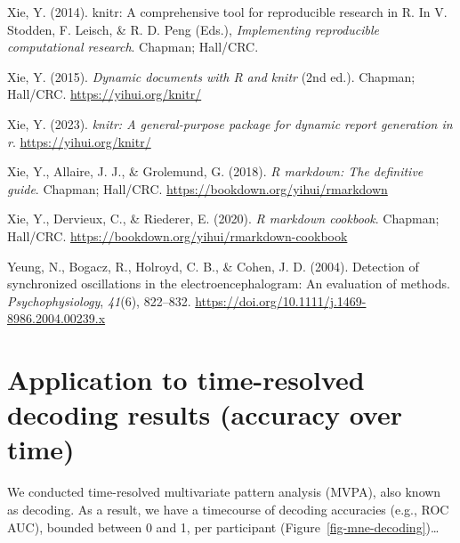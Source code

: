 \documentclass[
  doc,
  floatsintext,
  longtable,
  a4paper,
  nolmodern,
  notxfonts,
  notimes,
  colorlinks=true,linkcolor=blue,citecolor=blue,urlcolor=blue]{apa7}
\newlength{\cslhangindent}
\newenvironment{CSLReferences}[2] %
 {\begin{list}{}{%
  \setlength{\itemindent}{0pt}
  \setlength{\leftmargin}{0pt}
  \setlength{\parsep}{0pt}
  \ifodd #1
   \setlength{\leftmargin}{\cslhangindent}
   \setlength{\itemindent}{-1\cslhangindent}
  \fi
  \setlength{\itemsep}{#2\baselineskip}}}
 {\end{list}}
\begin{document}
\begin{CSLReferences}{1}{0}
Xie, Y. (2014). {knitr}: A comprehensive tool for reproducible research
in {R}. In V. Stodden, F. Leisch, \& R. D. Peng (Eds.),
\emph{Implementing reproducible computational research}. Chapman;
Hall/CRC.

Xie, Y. (2015). \emph{Dynamic documents with {R} and knitr} (2nd ed.).
Chapman; Hall/CRC. \url{https://yihui.org/knitr/}

Xie, Y. (2023). \emph{{knitr}: A general-purpose package for dynamic
report generation in r}. \url{https://yihui.org/knitr/}

Xie, Y., Allaire, J. J., \& Grolemund, G. (2018). \emph{R markdown: The
definitive guide}. Chapman; Hall/CRC.
\url{https://bookdown.org/yihui/rmarkdown}

Xie, Y., Dervieux, C., \& Riederer, E. (2020). \emph{R markdown
cookbook}. Chapman; Hall/CRC.
\url{https://bookdown.org/yihui/rmarkdown-cookbook}

Yeung, N., Bogacz, R., Holroyd, C. B., \& Cohen, J. D. (2004). Detection
of synchronized oscillations in the electroencephalogram: An evaluation
of methods. \emph{Psychophysiology}, \emph{41}(6), 822--832.
\url{https://doi.org/10.1111/j.1469-8986.2004.00239.x}

\end{CSLReferences}

\newpage

\appendix

\section{Application to time-resolved decoding results (accuracy over
time)}\label{application-to-time-resolved-decoding-results-accuracy-over-time}

We conducted time-resolved multivariate pattern analysis (MVPA), also
known as decoding. As a result, we have a timecourse of decoding
accuracies (e.g., ROC AUC), bounded between 0 and 1, per participant
(Figure~\ref{fig-mne-decoding})\ldots{}
\end{document}
